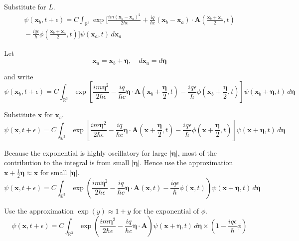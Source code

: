 Substitute for $L$.
\begin{multline*}
\psi(\mathbf x_b,t+\epsilon)=C\int_{\mathbb R^3}
\exp\biggl[\frac{im(\mathbf x_b-\mathbf x_a)^2}{2\hbar\epsilon}
+\frac{iq}{\hbar c}(\mathbf x_b-\mathbf x_a)
\cdot\mathbf A\left(\frac{\mathbf x_b+\mathbf x_a}{2},t\right)
\\
{}-\frac{iq\epsilon}{\hbar}\phi\left(\frac{\mathbf x_b+\mathbf x_a}{2},t\right)
\biggr]
\psi(\mathbf x_a,t)
\,d\mathbf x_a
\end{multline*}

Let
\begin{equation*}
\mathbf x_a=\mathbf x_b+\boldsymbol\eta,\quad
d\mathbf x_a=d\boldsymbol\eta
\end{equation*}

and write
\begin{equation*}
\psi(\mathbf x_b,t+\epsilon)
=C\int_{\mathbb R^3}
\exp\left[\frac{im\boldsymbol\eta^2}{2\hbar\epsilon}
-\frac{iq}{\hbar c}
\boldsymbol\eta\cdot\mathbf A\left(\mathbf x_b+\frac{\boldsymbol\eta}{2},t\right)
-\frac{iq\epsilon}{\hbar}\phi\left(\mathbf x_b+\frac{\boldsymbol\eta}{2},t\right)
\right]
\psi(\mathbf x_b+\boldsymbol\eta,t)
\,d\boldsymbol\eta
\end{equation*}

Substitute $\mathbf x$ for $\mathbf x_b$.
\begin{equation*}
\psi(\mathbf x,t+\epsilon)
=C\int_{\mathbb R^3}
\exp\left[\frac{im\boldsymbol\eta^2}{2\hbar\epsilon}
-\frac{iq}{\hbar c}
\boldsymbol\eta\cdot\mathbf A\left(\mathbf x+\frac{\boldsymbol\eta}{2},t\right)
-\frac{iq\epsilon}{\hbar}\phi\left(\mathbf x+\frac{\boldsymbol\eta}{2},t\right)
\right]
\psi(\mathbf x+\boldsymbol\eta,t)
\,d\boldsymbol\eta
\end{equation*}

Because the exponential is highly oscillatory for large $|\boldsymbol\eta|$,
most of the contribution to the integral is from small $|\boldsymbol\eta|$.
Hence use the approximation $\mathbf x+\tfrac{1}{2}\boldsymbol\eta\approx\mathbf x$
for small $|\boldsymbol\eta|$.
\begin{equation*}
\psi(\mathbf x,t+\epsilon)
=C\int_{\mathbb R^3}
\exp\left(\frac{im\boldsymbol\eta^2}{2\hbar\epsilon}
-\frac{iq}{\hbar c}
\boldsymbol\eta\cdot\mathbf A(\mathbf x,t)
-\frac{iq\epsilon}{\hbar}\phi\left(\mathbf x,t\right)
\right)
\psi(\mathbf x+\boldsymbol\eta,t)
\,d\boldsymbol\eta
\end{equation*}

Use the approximation $\exp(y)\approx1+y$ for the exponential of $\phi$.
\begin{equation*}
\psi(\mathbf x,t+\epsilon)
=C\int_{\mathbb R^3}
\exp\left(\frac{im\boldsymbol\eta^2}{2\hbar\epsilon}
-\frac{iq}{\hbar c}
\boldsymbol\eta\cdot\mathbf A
\right)
\psi(\mathbf x+\boldsymbol\eta,t)
\,d\boldsymbol\eta
\times\left(1-\frac{iq\epsilon}{\hbar}\phi\right)
\end{equation*}

